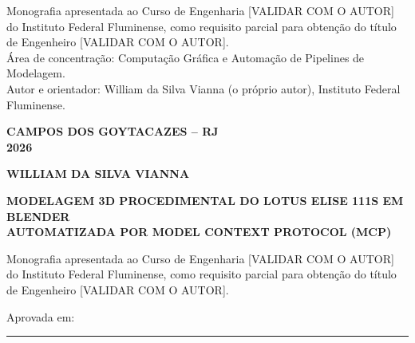\hfill
\begin{minipage}{0.55\textwidth}
  \SingleSpacing
  \footnotesize
  \raggedright
  Monografia apresentada ao Curso de Engenharia [VALIDAR COM O AUTOR] do Instituto Federal
  Fluminense, como requisito parcial para obten\c{c}\~ao do t\'itulo de Engenheiro
  [VALIDAR COM O AUTOR].\\[8pt]
  \'Area de concentra\c{c}\~ao: Computa\c{c}\~ao Gr\'afica e Automa\c{c}\~ao de Pipelines de
  Modelagem.\\[8pt]
  Autor e orientador: William da Silva Vianna (o pr\'oprio autor), Instituto Federal
  Fluminense.
\end{minipage}

\vfill

\begin{center}
  {\bfseries CAMPOS DOS GOYTACAZES -- RJ}\\[2pt]
  {\bfseries 2026}
\end{center}

\clearpage

\thispagestyle{empty}
\begin{center}
  {\bfseries\large WILLIAM DA SILVA VIANNA}
\end{center}
\vspace{2.0cm}
\begin{center}
  {\bfseries\Large MODELAGEM 3D PROCEDIMENTAL DO LOTUS ELISE 111S EM BLENDER\\
   AUTOMATIZADA POR MODEL CONTEXT PROTOCOL (MCP)}
\end{center}
\vspace{1.6cm}

\hfill
\begin{minipage}{0.62\textwidth}
  \SingleSpacing
  \footnotesize
  \raggedright
  Monografia apresentada ao Curso de Engenharia [VALIDAR COM O AUTOR] do Instituto Federal
  Fluminense, como requisito parcial para obten\c{c}\~ao do t\'itulo de Engenheiro
  [VALIDAR COM O AUTOR].
\end{minipage}

\vspace{1.4cm}

\begin{flushright}
  \footnotesize
  Aprovada em: \rule{3cm}{0.4pt}
\end{flushright}

\vspace{1.6cm}


